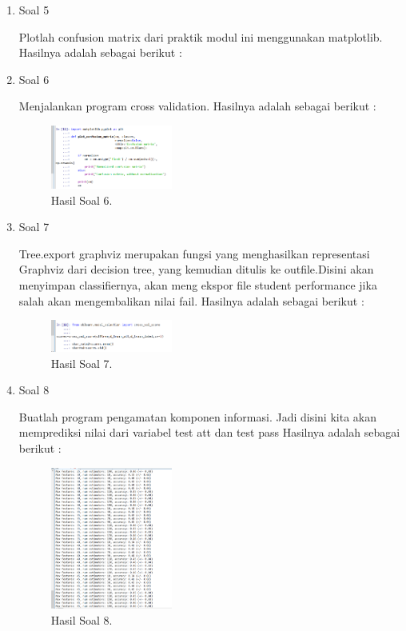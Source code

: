 \begin{enumerate}
	\item Soal 5
	\hfill\break
	
	Plotlah confusion matrix dari praktik modul ini menggunakan matplotlib. Hasilnya adalah sebagai berikut :


	\item Soal 6
	\hfill\break
	
	Menjalankan program cross validation. Hasilnya adalah sebagai berikut :
	\begin{figure}[H]
	\centering
		\includegraphics[width=4cm]{figures/1174080/4/hasil6.PNG}
		\caption{Hasil Soal 6.}
	\end{figure}

	\item Soal 7
	\hfill\break
	
	Tree.export graphviz merupakan fungsi yang menghasilkan representasi Graphviz dari decision tree, yang kemudian ditulis ke outfile.Disini akan menyimpan classifiernya, akan meng ekspor file student performance jika salah akan mengembalikan nilai fail. Hasilnya adalah sebagai berikut :
	\begin{figure}[H]
	\centering
		\includegraphics[width=4cm]{figures/1174080/4/hasil7.PNG}
		\caption{Hasil Soal 7.}
	\end{figure}

	\item Soal 8
	\hfill\break
	
	Buatlah program pengamatan komponen informasi. Jadi disini kita akan memprediksi nilai dari variabel test att dan test pass Hasilnya adalah sebagai berikut :
	\begin{figure}[H]
	\centering
		\includegraphics[width=4cm]{figures/1174080/4/hasil8.PNG}
		\caption{Hasil Soal 8.}
	\end{figure}
\end{enumerate}


